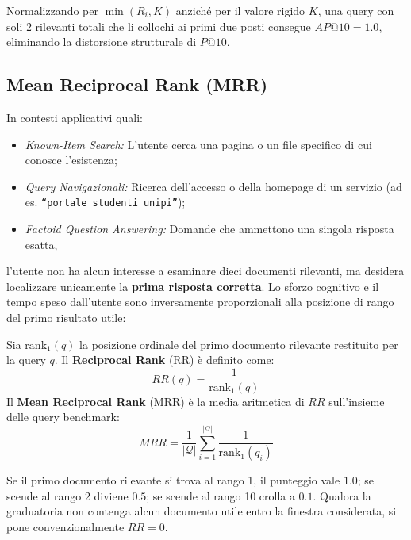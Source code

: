 Normalizzando per $\min(R_i, K)$ anziché per il valore rigido $K$, una query con soli 2 rilevanti totali che li collochi ai primi due posti consegue $AP@10 = 1.0$, eliminando la distorsione strutturale di $P@10$.

\FloatBarrier
\subsection{Mean Reciprocal Rank (MRR)}
\label{subsec:mean-reciprocal-rank-mrr}

In contesti applicativi quali:
\begin{itemize}
    \item \textit{Known-Item Search:} L'utente cerca una pagina o un file specifico di cui conosce l'esistenza;
    \item \textit{Query Navigazionali:} Ricerca dell'accesso o della homepage di un servizio (ad es. \texttt{``portale studenti unipi''});
    \item \textit{Factoid Question Answering:} Domande che ammettono una singola risposta esatta,
\end{itemize}
l'utente non ha alcun interesse a esaminare dieci documenti rilevanti, ma desidera localizzare unicamente la \textbf{prima risposta corretta}. Lo sforzo cognitivo e il tempo speso dall'utente sono inversamente proporzionali alla posizione di rango del primo risultato utile:

\begin{definition}
Sia $\mathrm{rank}_1(q)$ la posizione ordinale del primo documento rilevante restituito per la query $q$. Il \textbf{Reciprocal Rank} (RR) \`e definito come:
\begin{equation}
RR(q) = \frac{1}{\mathrm{rank}_1(q)}
\end{equation}
Il \textbf{Mean Reciprocal Rank} (MRR) \`e la media aritmetica di $RR$ sull'insieme delle query benchmark:
\begin{equation}
MRR = \frac{1}{|\mathcal{Q}|} \sum_{i=1}^{|\mathcal{Q}|} \frac{1}{\mathrm{rank}_1(q_i)}
\end{equation}
\end{definition}

Se il primo documento rilevante si trova al rango 1, il punteggio vale $1.0$; se scende al rango 2 diviene $0.5$; se scende al rango 10 crolla a $0.1$. Qualora la graduatoria non contenga alcun documento utile entro la finestra considerata, si pone convenzionalmente $RR = 0$.

\FloatBarrier
